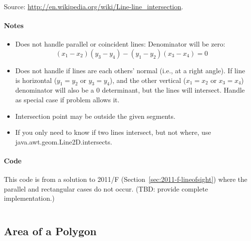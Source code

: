Source: \href{http://en.wikipedia.org/wiki/Line-line_intersection}{http://en.wikipedia.org/wiki/Line-line\_intersection}.

\paragraph{Notes}
\begin{itemize}
\item Does not handle parallel or coincident lines:
    Denominator will be zero:
    \[
        (x_1 - x_2) (y_3 - y_4) - (y_1 - y_2) (x_3 - x_4) = 0
    \]
\item Does not handle if lines are each others' normal (i.e., at a right angle).
    If line is horizontal ($y_1 = y_2$ or $y_3 = y_4$), and the other vertical ($x_1 = x_2$ or $x_3 = x_4$) 
    denominator will also be a 0 determinant, but the lines will intersect.  
    Handle as special case if problem allows it.

\item Intersection point may be outside the given segments.

\item If you only need to know if two lines intersect, but not where, use java.awt.geom.Line2D.intersects.
\end{itemize}

\paragraph{Code}

This code is from a solution to 2011/F (Section~\ref{sec:2011-f-lineofsight}) where the 
parallel and rectangular cases do not occur. (TBD: provide complete implementation.)

\inputminted[fontsize=\footnotesize,linenos=true]{java}{code/lineintersection.java}

%
%
%

\subsection{Area of a Polygon}
\label{sec:areapolygon}


